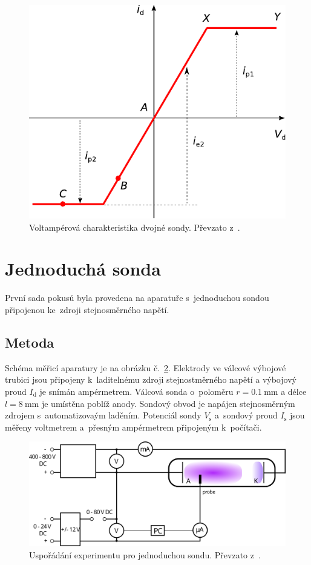 \documentclass{protokol}
\newcommand\idisch{I_\mathrm{d}}
\newcommand\iprobe{I_\mathrm{s}}
\newcommand\potprobe{V_\mathrm{s}}
\begin{document}
\begin{figure}[tbp]
	\centering
	\includegraphics{vac-double}
	\caption{Voltampérová charakteristika dvojné sondy.
		Převzato z~\autocite{talsky}.}
	\label{fig:vac-double}
\end{figure}


\section{Jednoduchá sonda}
\label{sec:simple}
První sada pokusů byla provedena na aparatuře s~jednoduchou sondou
připojenou ke~zdroji stejnosměrného napětí.

\subsection{Metoda}
\label{sec:method-simple}
Schéma měřicí aparatury je na obrázku č.~\ref{fig:diagram-simple}.
Elektrody ve válcové výbojové trubici jsou připojeny k~laditelnému zdroji
stejnostměrného napětí a výbojový proud $\idisch$ je snímán ampérmetrem.
Válcová sonda o~poloměru $r=\SI{0.1}{\milli\metre}$
a délce $l=\SI{8}{\milli\metre}$ je umístěna poblíž anody.
Sondový obvod je napájen stejnosměrným zdrojem s~automatizovaým laděním.
Potenciál sondy $\potprobe$ a~sondový proud $\iprobe$ jsou měřeny
voltmetrem a~přesným ampérmetrem připojeným k~počítači.

\begin{figure}[htp]
	\centering
	\includegraphics{diagram-simple.png}
	\caption{Uspořádání experimentu pro jednoduchou sondu.
		Převzato z~\autocite{assignment-simpleprobe}.}
	\label{fig:diagram-simple}
\end{figure}
\end{document}
